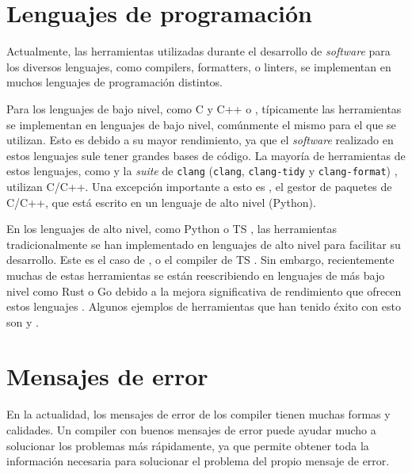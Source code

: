 
\section{Lenguajes de programación}

Actualmente, las herramientas utilizadas durante el desarrollo de
\textit{software} para los diversos lenguajes, como \glspl{compiler},
\glspl{formatter}, o \glspl{linter}, se implementan en muchos lenguajes de
programación distintos.

Para los lenguajes de bajo nivel, como C \parencite{C} y C++ \parencite{cpp} o
, típicamente las herramientas se implementan en
lenguajes de bajo nivel, comúnmente el mismo para el que se utilizan. Esto es
debido a su mayor rendimiento, ya que el \textit{software} realizado en estos
lenguajes sule tener grandes bases de código. La mayoría de herramientas de
estos lenguajes, como  y la \textit{suite} de \verb!clang!
(\verb!clang!, \verb!clang-tidy! y \verb!clang-format!) \parencite{clang},
utilizan C/C++. Una excepción importante a esto es , el gestor de
paquetes de C/C++, que está escrito en un lenguaje de alto nivel (Python).

En los lenguajes de alto nivel, como Python \parencite{Python} o \gls{TS}
\parencite{typescript}, las herramientas tradicionalmente se han implementado en
lenguajes de alto nivel para facilitar su desarrollo. Este es el caso de
,  o el \gls{compiler} de \gls{TS}
\parencite{tsc}. Sin embargo, recientemente muchas de estas herramientas se
están reescribiendo en lenguajes de más bajo nivel como Rust \parencite{Rust} o
Go \parencite{Go} debido a la mejora significativa de rendimiento que ofrecen
estos lenguajes \parencite{typescript-go}. Algunos ejemplos de herramientas que
han tenido éxito con esto son  y .

\section{Mensajes de error}

En la actualidad, los mensajes de error de los \gls{compiler} tienen muchas
formas y calidades. Un \gls{compiler} con buenos mensajes de error puede ayudar
mucho a solucionar los problemas más rápidamente, ya que permite obtener toda la
información necesaria para solucionar el problema del propio mensaje de error.

